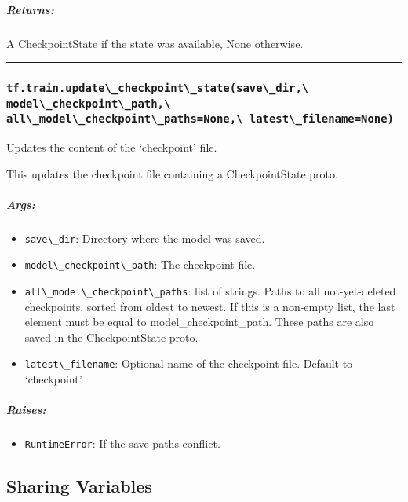 \subparagraph{Returns: }\label{returns-18}

A CheckpointState if the state was available, None otherwise.

\begin{center}\rule{0.5\linewidth}{\linethickness}\end{center}

\subsubsection{\texorpdfstring{\lstinline{tf.train.update\_checkpoint\_state(save\_dir,\ model\_checkpoint\_path,\ all\_model\_checkpoint\_paths=None,\ latest\_filename=None)}
}{tf.train.update\_checkpoint\_state(save\_dir, model\_checkpoint\_path, all\_model\_checkpoint\_paths=None, latest\_filename=None) }}\label{tf.train.updateux5fcheckpointux5fstatesaveux5fdir-modelux5fcheckpointux5fpath-allux5fmodelux5fcheckpointux5fpathsnone-latestux5ffilenamenone}

Updates the content of the `checkpoint' file.

This updates the checkpoint file containing a CheckpointState proto.

\subparagraph{Args: }\label{args-15}

\begin{itemize}
\tightlist
\item
  \lstinline{save\_dir}: Directory where the model was saved.
\item
  \lstinline{model\_checkpoint\_path}: The checkpoint file.
\item
  \lstinline{all\_model\_checkpoint\_paths}: list of strings. Paths to all
  not-yet-deleted checkpoints, sorted from oldest to newest. If this is
  a non-empty list, the last element must be equal to
  model\_checkpoint\_path. These paths are also saved in the
  CheckpointState proto.
\item
  \lstinline{latest\_filename}: Optional name of the checkpoint file.
  Default to `checkpoint'.
\end{itemize}

\subparagraph{Raises: }\label{raises-5}

\begin{itemize}
\tightlist
\item
  \lstinline{RuntimeError}: If the save paths conflict.
\end{itemize}

\subsection{Sharing Variables }\label{sharing-variables}

